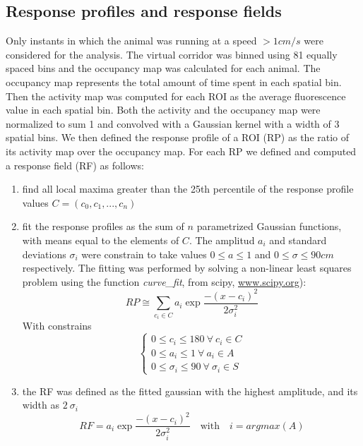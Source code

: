\subsection{Response profiles and response fields}
Only instants in which the animal was running at a speed $> 1 cm/s$ were considered for the analysis. 
The virtual corridor was binned using 81 equally spaced bins and the occupancy map was calculated for each animal. 
The occupancy map represents the total amount of time spent in each spatial bin. 
Then the activity map was computed for each ROI as the average fluorescence value in each spatial bin. 
Both the activity and the occupancy map were normalized to sum 1 and convolved with a Gaussian kernel with a width of 3 spatial bins. 
We then defined the response profile of a ROI (RP) as the ratio of its activity map over the occupancy map. 
For each RP we defined and computed a response field (RF) as follows: 
\begin{enumerate}[label=\roman*)]
    \item find all local maxima greater than the 25th percentile of the response profile values  $C = (c_0, c_1, ... , c_n)$
    \item fit the response profiles as the sum of $n$ parametrized Gaussian functions, with means equal to the elements of $C$.
    The amplitud $a_i$ and standard deviations $\sigma_i$ were constrain to take values $ 0 \leq a \leq 1 $ and $0 \leq \sigma \leq 90 cm$ respectively. 
    The fitting was performed by solving a non-linear least squares problem using the function \textit{curve\_fit}, from scipy, \url{www.scipy.org}):
    \begin{equation}
        RP \cong \sum_{c_i\in C} a_i\exp{\frac{-(x-c_i)^2}{2\sigma_i^2}}
    \end{equation}
    With constrains 
    \begin{equation}
        \begin{cases}
            0\leq c_i \leq 180\ \forall\ c_i \in C \\
                0\leq a_i \leq 1\ \forall\ a_i \in A \\
                    0\leq \sigma_i \leq 90\ \forall\ \sigma_i \in S
        \end{cases}
    \end{equation}
    \item the RF was defined as the fitted gaussian with the highest amplitude, and its width as $2\ \sigma_i$
    \begin{equation}
        RF = a_i\exp{\frac{-(x-c_i)^2}{2\sigma_i^2}} \quad \text{with} \quad  i=argmax(A)
    \end{equation}
\end{enumerate}

